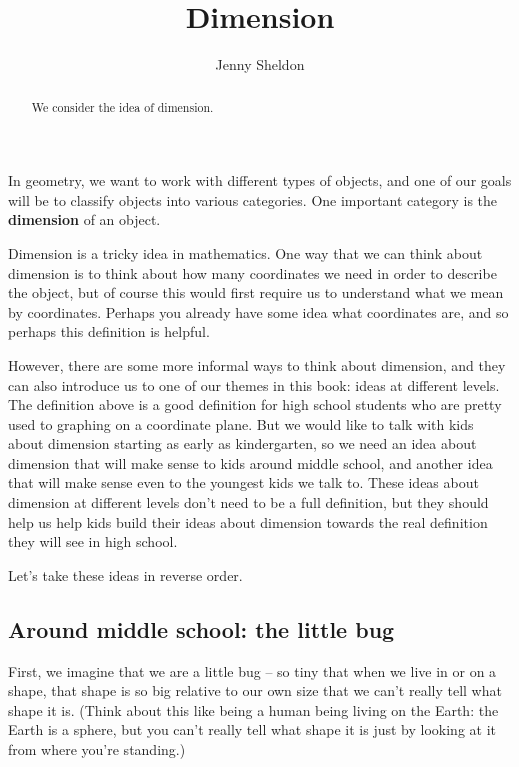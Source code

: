 \documentclass{ximera}
\title{Dimension}
\author{Jenny Sheldon}
\begin{document}
\begin{abstract}
We consider the idea of dimension.
\end{abstract}
\maketitle

In geometry, we want to work with different types of objects, and one of our goals will be to classify objects into various categories. One important category is the {\bf dimension} of an object.

Dimension is a tricky idea in mathematics. One way that we can think about dimension is to think about how many coordinates we need in order to describe the object, but of course this would first require us to understand what we mean by coordinates. Perhaps you already have some idea what coordinates are, and so perhaps this definition is helpful.

However, there are some more informal ways to think about dimension, and they can also introduce us to one of our themes in this book: ideas at different levels. The definition above is a good definition for high school students who are pretty used to graphing on a coordinate plane. But we would like to talk with kids about dimension starting as early as kindergarten, so we need an idea about dimension that will make sense to kids around middle school, and another idea that will make sense even to the youngest kids we talk to. These ideas about dimension at different levels don't need to be a full definition, but they should help us help kids build their ideas about dimension towards the real definition they will see in high school. 

Let's take these ideas in reverse order.

\subsection{Around middle school: the little bug}

First, we imagine that we are a little bug -- so tiny that when we live in or on a shape, that shape is so big relative to our own size that we can't really tell what shape it is. (Think about this like being a human being living on the Earth: the Earth is a sphere, but you can't really tell what shape it is just by looking at it from where you're standing.)
\end{document}
